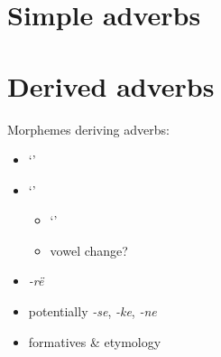 \documentclass{memoir}
\begin{document}
\section{\texorpdfstring{Simple adverbs
\label{sec:simpleadv}}{Simple adverbs }}


\section{\texorpdfstring{Derived adverbs
\label{sec:derivedadv}}{Derived adverbs }}

Morphemes deriving adverbs:

\begin{itemize}
\item
   `'
\item
   `'

  \begin{itemize}
  \tightlist
  \item
     `'
  \item
    vowel change?
  \end{itemize}
\item
  \emph{-rë}
\item
  potentially \emph{-se}, \emph{-ke}, \emph{-ne}
\item
  formatives \& etymology
\end{itemize}

\subsection{\texorpdfstring{}{}}
\end{document}
